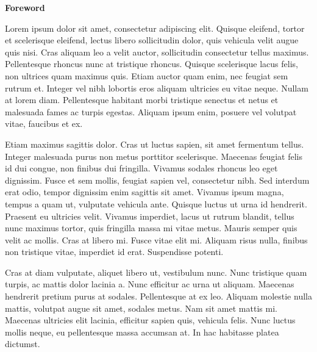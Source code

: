 \documentclass[a4paper, 11pt, oneside]{book} %
\begin{document}
\tableofcontents

\newpage

{\LARGE{\textbf{Foreword}}}

Lorem ipsum dolor sit amet, consectetur adipiscing elit. Quisque eleifend, tortor et scelerisque eleifend, lectus libero sollicitudin dolor, quis vehicula velit augue quis nisi. Cras aliquam leo a velit auctor, sollicitudin consectetur tellus maximus. Pellentesque rhoncus nunc at tristique rhoncus. Quisque scelerisque lacus felis, non ultrices quam maximus quis. Etiam auctor quam enim, nec feugiat sem rutrum et. Integer vel nibh lobortis eros aliquam ultricies eu vitae neque. Nullam at lorem diam. Pellentesque habitant morbi tristique senectus et netus et malesuada fames ac turpis egestas. Aliquam ipsum enim, posuere vel volutpat vitae, faucibus et ex.

Etiam maximus sagittis dolor. Cras ut luctus sapien, sit amet fermentum tellus. Integer malesuada purus non metus porttitor scelerisque. Maecenas feugiat felis id dui congue, non finibus dui fringilla. Vivamus sodales rhoncus leo eget dignissim. Fusce et sem mollis, feugiat sapien vel, consectetur nibh. Sed interdum erat odio, tempor dignissim enim sagittis sit amet. Vivamus ipsum magna, tempus a quam ut, vulputate vehicula ante. Quisque luctus ut urna id hendrerit. Praesent eu ultricies velit. Vivamus imperdiet, lacus ut rutrum blandit, tellus nunc maximus tortor, quis fringilla massa mi vitae metus. Mauris semper quis velit ac mollis. Cras at libero mi. Fusce vitae elit mi. Aliquam risus nulla, finibus non tristique vitae, imperdiet id erat. Suspendisse potenti.

Cras at diam vulputate, aliquet libero ut, vestibulum nunc. Nunc tristique quam turpis, ac mattis dolor lacinia a. Nunc efficitur ac urna ut aliquam. Maecenas hendrerit pretium purus at sodales. Pellentesque at ex leo. Aliquam molestie nulla mattis, volutpat augue sit amet, sodales metus. Nam sit amet mattis mi. Maecenas ultricies elit lacinia, efficitur sapien quis, vehicula felis. Nunc luctus mollis neque, eu pellentesque massa accumsan at. In hac habitasse platea dictumst.


\newpage

\mainmatter


\end{document}
